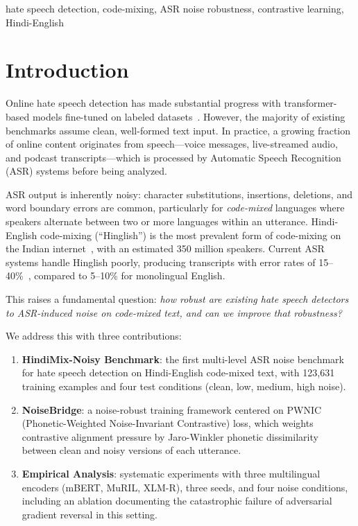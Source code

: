 \documentclass[conference]{IEEEtran}
\begin{document}
\begin{IEEEkeywords}
hate speech detection, code-mixing, ASR noise robustness, contrastive learning, Hindi-English
\end{IEEEkeywords}

\section{Introduction}

Online hate speech detection has made substantial progress with transformer-based models fine-tuned on labeled datasets~\cite{davidson2017automated, mathew2021hatexplain}. However, the majority of existing benchmarks assume clean, well-formed text input. In practice, a growing fraction of online content originates from speech---voice messages, live-streamed audio, and podcast transcripts---which is processed by Automatic Speech Recognition (ASR) systems before being analyzed.

ASR output is inherently noisy: character substitutions, insertions, deletions, and word boundary errors are common, particularly for \textit{code-mixed} languages where speakers alternate between two or more languages within an utterance. Hindi-English code-mixing (``Hinglish'') is the most prevalent form of code-mixing on the Indian internet~\cite{barman2014code}, with an estimated 350 million speakers. Current ASR systems handle Hinglish poorly, producing transcripts with error rates of 15--40\%~\cite{shah2020learning}, compared to 5--10\% for monolingual English.

This raises a fundamental question: \textit{how robust are existing hate speech detectors to ASR-induced noise on code-mixed text, and can we improve that robustness?}

We address this with three contributions:

\begin{enumerate}
\item \textbf{HindiMix-Noisy Benchmark}: the first multi-level ASR noise benchmark for hate speech detection on Hindi-English code-mixed text, with 123,631 training examples and four test conditions (clean, low, medium, high noise).

\item \textbf{NoiseBridge}: a noise-robust training framework centered on PWNIC (Phonetic-Weighted Noise-Invariant Contrastive) loss, which weights contrastive alignment pressure by Jaro-Winkler phonetic dissimilarity between clean and noisy versions of each utterance.

\item \textbf{Empirical Analysis}: systematic experiments with three multilingual encoders (mBERT, MuRIL, XLM-R), three seeds, and four noise conditions, including an ablation documenting the catastrophic failure of adversarial gradient reversal in this setting.
\end{enumerate}
\end{document}
